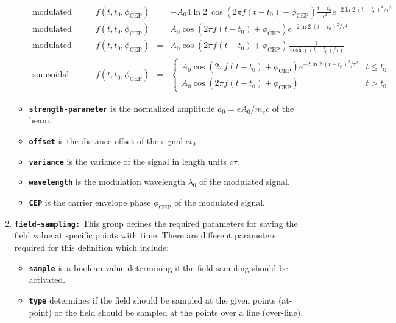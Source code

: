 \begin{enumerate}
\begin{itemize}
\begin{equation}
\begin{array}{lrcl}
	\mbox{modulated Neumann:}  \qquad & f(t,t_0,\phi_\mathrm{CEP}) & = & \displaystyle - A_0 4 \ln 2 \: \cos( 2 \pi f (t - t_0) + \phi_\mathrm{CEP} ) \frac{t - t_0}{\tau^2} e^{-2 \ln 2 \: (t - t_0)^2/\tau^2 } \\
	\mbox{modulated Gaussian:} \qquad & f(t,t_0,\phi_\mathrm{CEP}) & = & \displaystyle A_0 \cos( 2 \pi f (t - t_0) + \phi_\mathrm{CEP} ) e^{-2 \ln 2 \: (t - t_0)^2/\tau^2 } \\
	\mbox{modulated hyperbolic secant:} \qquad & f(t,t_0,\phi_\mathrm{CEP}) & = & \displaystyle A_0 \cos( 2 \pi f (t - t_0) + \phi_\mathrm{CEP} ) \frac{1}{\cosh ( (t - t_0)/\tau ) } \\
	\mbox{sinusoidal pulse:}   \qquad & f(t,t_0,\phi_\mathrm{CEP}) & = & \displaystyle \left\{ \begin{array}{ll} A_0 \cos( 2 \pi f (t - t_0) + \phi_\mathrm{CEP} ) e^{-2 \ln 2 \: (t - t_0)^2/\tau^2 } & t \leq t_0 \\ A_0 \cos( 2 \pi f (t - t_0) + \phi_\mathrm{CEP} ) & t > t_0 \end{array} \right.
	\end{array}
	\end{equation}
	\item \textbf{\texttt{strength-parameter}} is the normalized amplitude $a_0 = e A_0 / m_ec $ of the beam.
	\item \textbf{\texttt{offset}} is the distance offset of the signal $ct_0$.
	\item \textbf{\texttt{variance}} is the variance of the signal in length units $c\tau$.
	\item \textbf{\texttt{wavelength}} is the modulation wavelength $\lambda_0$ of the modulated signal.
	\item \textbf{\texttt{CEP}} is the carrier envelope phase $\phi_{\mathrm{CEP}}$ of the modulated signal.
\end{itemize}
\item \textbf{\texttt{field-sampling:}} This group defines the required parameters for saving the field value at specific points with time. There are different parameters required for this definition which include:
\begin{itemize}
	\item \textbf{\texttt{sample}} is a boolean value determining if the field sampling should be activated.
	\item \textbf{\texttt{type}} determines if the field should be sampled at the given points (at-point) or the field should be sampled at the points over a line (over-line).

\end{itemize}
\end{enumerate}
